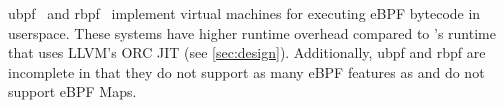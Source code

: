 ubpf~\cite{ubpf} and rbpf~\cite{rbpf} implement virtual machines for executing eBPF bytecode in userspace.  These systems have higher runtime overhead compared to \sys's runtime that uses LLVM's ORC JIT\cite{Lattner04,lu2022bring} (see \cref{sec:design}).  Additionally, ubpf and rbpf are incomplete in that they do not support as many eBPF features as \sys and do not support eBPF Maps.




